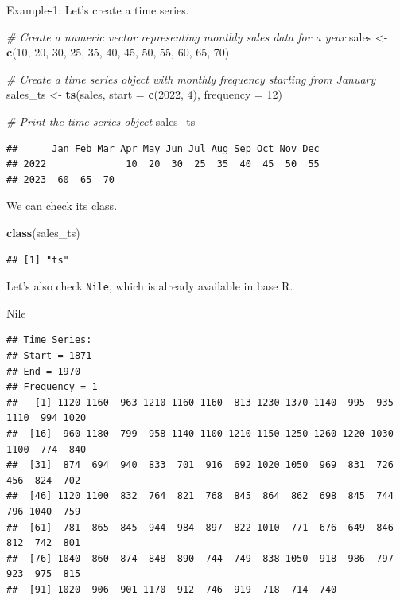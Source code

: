 \documentclass[
]{book}
\newenvironment{Shaded}{\begin{snugshade}}{\end{snugshade}}
\newcommand{\AttributeTok}[1]{\textcolor[rgb]{0.13,0.29,0.53}{#1}}
\newcommand{\CommentTok}[1]{\textcolor[rgb]{0.56,0.35,0.01}{\textit{#1}}}
\newcommand{\DecValTok}[1]{\textcolor[rgb]{0.00,0.00,0.81}{#1}}
\newcommand{\FunctionTok}[1]{\textcolor[rgb]{0.13,0.29,0.53}{\textbf{#1}}}
\newcommand{\NormalTok}[1]{#1}
\newcommand{\OtherTok}[1]{\textcolor[rgb]{0.56,0.35,0.01}{#1}}
\begin{document}
Example-1: Let's create a time series.

\begin{Shaded}
\begin{Highlighting}[]
\CommentTok{\# Create a numeric vector representing monthly sales data for a year}
\NormalTok{sales }\OtherTok{\textless{}{-}} \FunctionTok{c}\NormalTok{(}\DecValTok{10}\NormalTok{, }\DecValTok{20}\NormalTok{, }\DecValTok{30}\NormalTok{, }\DecValTok{25}\NormalTok{, }\DecValTok{35}\NormalTok{, }\DecValTok{40}\NormalTok{, }\DecValTok{45}\NormalTok{, }\DecValTok{50}\NormalTok{, }\DecValTok{55}\NormalTok{, }\DecValTok{60}\NormalTok{, }\DecValTok{65}\NormalTok{, }\DecValTok{70}\NormalTok{)}

\CommentTok{\# Create a time series object with monthly frequency starting from January}
\NormalTok{sales\_ts }\OtherTok{\textless{}{-}} \FunctionTok{ts}\NormalTok{(sales, }\AttributeTok{start =} \FunctionTok{c}\NormalTok{(}\DecValTok{2022}\NormalTok{, }\DecValTok{4}\NormalTok{), }\AttributeTok{frequency =} \DecValTok{12}\NormalTok{)}

\CommentTok{\# Print the time series object}
\NormalTok{sales\_ts}
\end{Highlighting}
\end{Shaded}

\begin{verbatim}
##      Jan Feb Mar Apr May Jun Jul Aug Sep Oct Nov Dec
## 2022              10  20  30  25  35  40  45  50  55
## 2023  60  65  70
\end{verbatim}

We can check its class.

\begin{Shaded}
\begin{Highlighting}[]
\FunctionTok{class}\NormalTok{(sales\_ts)}
\end{Highlighting}
\end{Shaded}

\begin{verbatim}
## [1] "ts"
\end{verbatim}

Let's also check \texttt{Nile}, which is already available in base R.

\begin{Shaded}
\begin{Highlighting}[]
\NormalTok{Nile}
\end{Highlighting}
\end{Shaded}

\begin{verbatim}
## Time Series:
## Start = 1871 
## End = 1970 
## Frequency = 1 
##   [1] 1120 1160  963 1210 1160 1160  813 1230 1370 1140  995  935 1110  994 1020
##  [16]  960 1180  799  958 1140 1100 1210 1150 1250 1260 1220 1030 1100  774  840
##  [31]  874  694  940  833  701  916  692 1020 1050  969  831  726  456  824  702
##  [46] 1120 1100  832  764  821  768  845  864  862  698  845  744  796 1040  759
##  [61]  781  865  845  944  984  897  822 1010  771  676  649  846  812  742  801
##  [76] 1040  860  874  848  890  744  749  838 1050  918  986  797  923  975  815
##  [91] 1020  906  901 1170  912  746  919  718  714  740
\end{verbatim}
\end{document}
